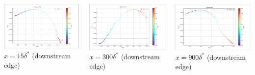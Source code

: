 \documentclass[
  aspectratio=169, %
  t, %
  onlytextwidth, %
  10pt, %
]{beamer}
\begin{document}
\begin{frame}
	\begin{columns}[T] %
		\begin{column}{0.32\linewidth} %
			\includegraphics[width=\linewidth]{Images/osX15.png}
			$x=15\delta^*$ (downstream edge)
		\end{column}
		\begin{column}{0.32\linewidth} %
			\includegraphics[width=\linewidth]{Images/osX300.png}
			$x=300\delta^*$ (downstream edge)
		\end{column}
		\begin{column}{0.32\linewidth} %
			\includegraphics[width=\linewidth]{Images/osX900.png}
			$x=900\delta^*$ (downstream edge)
		\end{column}
	\end{columns}
\end{frame}
\end{document}
